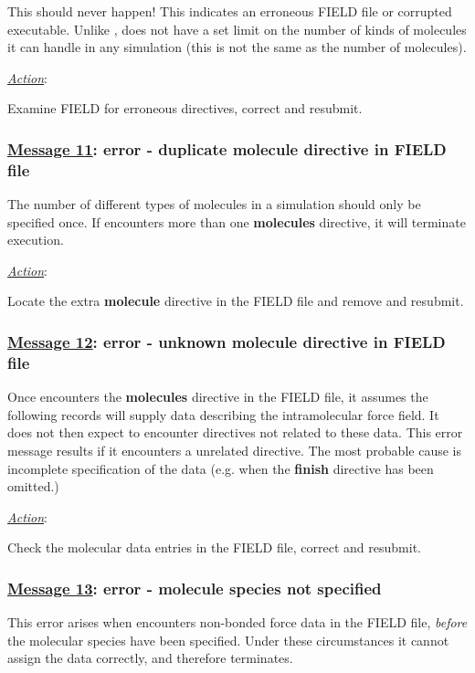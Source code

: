 This should never happen!  This indicates an erroneous FIELD file
or corrupted \D executable.  Unlike \C, \D does not have a
set limit on the number of kinds of molecules it can handle in any
simulation (this is not the same as the number of molecules).

\noindent \underline{\em Action}:

Examine FIELD for erroneous directives, correct and resubmit.

\subsubsection*{\underline{Message 11}: error - duplicate molecule directive in FIELD file}

The number of different types of molecules in a simulation should
only be specified once.  If \D encounters more than one {\bf
molecules} directive, it will terminate execution.

\noindent \underline{\em Action}:

Locate the extra {\bf molecule} directive in the FIELD file and
remove and resubmit.

\subsubsection*{\underline{Message 12}: error - unknown molecule directive in FIELD file}

Once \D encounters the {\bf molecules} directive in the FIELD
file, it assumes the following records will supply data describing
the intramolecular force field.  It does not
then expect to encounter directives not related to these data.
This error message results if it encounters a unrelated directive.
The most probable cause is incomplete specification of the data
(e.g.  when the {\bf finish} directive has been omitted.)

\noindent \underline{\em Action}:

Check the molecular data entries in the FIELD file, correct and
resubmit.

\subsubsection*{\underline{Message 13}: error - molecule species not specified}

This error arises when \D encounters
non-bonded force data in the FIELD file,
{\em before} the molecular species have been specified.
Under these circumstances it cannot assign the data
correctly, and therefore terminates.

